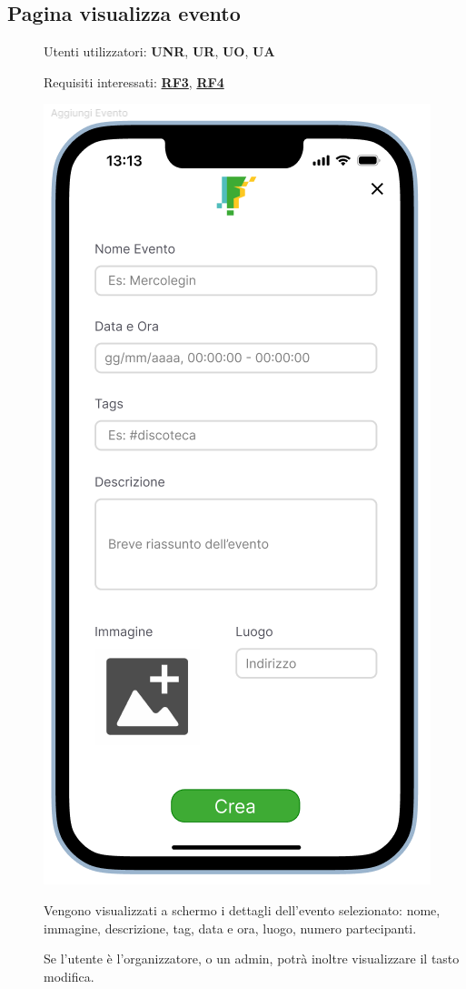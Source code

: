 \documentclass{article}
\begin{document}
\subsection{Pagina visualizza evento}
\begin{description}
    \item[] Utenti utilizzatori: \textbf{UNR}, \textbf{UR}, \textbf{UO}, \textbf{UA}
    \item[] Requisiti interessati: \hyperref[rf_3]{\textbf{RF3}}, \hyperref[rf_4]{\textbf{RF4}}
    \item[] \begin{center}
            \includegraphics[scale=0.6]{Aggiungi_Evento.png}
        \end{center}
    \item[] Vengono visualizzati a schermo i dettagli dell'evento selezionato: nome, immagine, descrizione, tag, data e ora, luogo, numero partecipanti.
    \item[] Se l'utente è l'organizzatore, o un admin, potrà inoltre visualizzare il tasto modifica.
\end{description}
\clearpage
\end{document}

